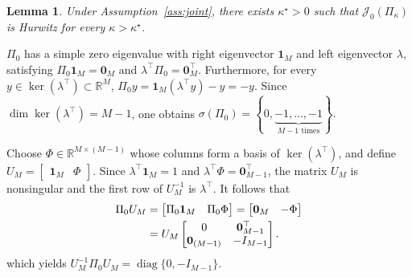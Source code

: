\documentclass[conference]{IEEEtran}
\newtheorem{lemma}{Lemma}
\begin{document}
	\begin{lemma}\label{lem:J0}
		Under Assumption~\ref{ass:joint}, there exists
		$\kappa^\star>0$ such that
		$\mathcal J_0(\Pi_\kappa)$ is Hurwitz for every
		$\kappa>\kappa^\star$.
	\end{lemma}
	
	\begin{IEEEproof}
		$\Pi_0$ has a simple zero eigenvalue with right eigenvector $\mathbf{1}_M$ and left eigenvector $\lambda$, satisfying $\Pi_0\mathbf 1_M=\mathbf 0_M$ and $\lambda^\top\Pi_0=\mathbf 0_{M}^\top$.
		Furthermore, for every
		$y\in\ker(\lambda^\top)\subset\mathbb R^M$,
		$
		\Pi_0y
		=
		\mathbf 1_M(\lambda^\top y)-y
		=
		-y.
		$
		Since
		$\dim\ker(\lambda^\top)=M-1$, one obtains
		$
		\sigma(\Pi_0)
		=
		\left\{
		0,
		\underbrace{-1,\ldots,-1}_{M-1\text{ times}}
		\right\}.
		$
		
		Choose
		$
		\Phi\in\mathbb R^{M\times(M-1)}
		$
		whose columns form a basis of $\ker(\lambda^\top)$, and define
		$
		U_M=
		\begin{bmatrix}
			\mathbf 1_M & \Phi
		\end{bmatrix}.
		$
		Since $\lambda^\top\mathbf 1_M=1$ and
		$\lambda^\top\Phi=\mathbf 0_{M-1}^\top$, the matrix $U_M$ is nonsingular and the
		first row of $U_M^{-1}$ is $\lambda^\top$. It follows that
		\vspace{-0.2\baselineskip}
		\[
		\begin{aligned}
			\Pi_0 U_M
			&=
			\begin{bmatrix}
				\Pi_0\mathbf 1_M & \Pi_0\Phi
			\end{bmatrix}
			=
			\begin{bmatrix}
				\mathbf 0_M & -\Phi
			\end{bmatrix} \\
			&=
			U_M
			\begin{bmatrix}
				0 & \mathbf 0_{M-1}^\top\\
				\mathbf 0_{(M-1)} & -I_{M-1}
			\end{bmatrix}.
		\end{aligned}
		\vspace{-0.2\baselineskip}
		\]
		which yields
		$
		U_M^{-1}\Pi_0U_M
		=
		\operatorname{diag}\{0,-I_{M-1}\}.
		$
		

\end{IEEEproof}
\end{document}
